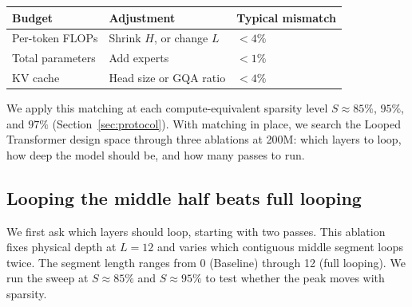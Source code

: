 \documentclass[]{bytedance_seed}
\theoremstyle{definition}
\theoremstyle{remark}
\begin{document}
\begin{center}
\begin{minipage}{\linewidth}
\small
{}
\label{tab:matching}
\centering
\begin{tabular}{lll}
\toprule
Budget & Adjustment & Typical mismatch \\
\midrule
Per-token FLOPs & Shrink $H$, or change $L$ & $<4\%$ \\
Total parameters & Add experts & $<1\%$ \\
KV cache & Head size or GQA ratio & $<4\%$ \\
\bottomrule
\end{tabular}
\end{minipage}
\end{center}

We apply this matching at each compute-equivalent sparsity level $S \approx 85\%$, $95\%$, and $97\%$ (Section~\ref{sec:protocol}).
%
With matching in place, we search the Looped Transformer design space through three ablations at 200M: which layers to loop, how deep the model should be, and how many passes to run.
%

\subsection{Looping the middle half beats full looping}
\label{sec:loop-span}

We first ask which layers should loop, starting with two passes.
%
This ablation fixes physical depth at $L = 12$ and varies which contiguous middle segment loops twice.
%
The segment length ranges from 0 (Baseline) through 12 (full looping).
%
We run the sweep at $S \approx 85\%$ and $S \approx 95\%$ to test whether the peak moves with sparsity.
%
\end{document}
